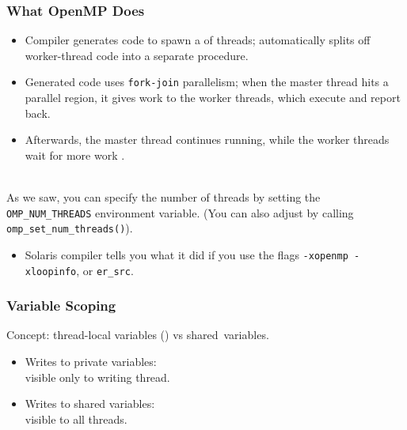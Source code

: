 \documentclass[aspectratio=43]{beamer}
\newenvironment{changemargin}[1]{%
  \begin{list}{}{%
    \setlength{\topsep}{0pt}%
    \setlength{\leftmargin}{#1}%
    \setlength{\rightmargin}{1em}
    \setlength{\listparindent}{\parindent}%
    \setlength{\itemindent}{\parindent}%
    \setlength{\parsep}{\parskip}%
  }%
  \item[]}{\end{list}}
\begin{document}
\begin{frame}[containsverbatim]
  \frametitle{What OpenMP Does}

  \begin{changemargin}{2cm}
  \begin{itemize}
    \item Compiler generates code to spawn a 
of threads; automatically splits off worker-thread code into a
separate procedure.
    \item Generated code uses {\tt fork-join} parallelism; when the
master thread hits a parallel region, it gives work to the worker
threads, which execute and report back.
    \item Afterwards, the master thread
continues running, while the worker threads wait for more work .
  \end{itemize}

~\\
As we saw, you can specify the number of threads by setting the
\verb+OMP_NUM_THREADS+ environment variable. (You can also adjust by calling 
\verb+omp_set_num_threads()+).

\begin{itemize}
  \item Solaris compiler tells you what it did if you use the flags \verb+-xopenmp -xloopinfo+, or \verb+er_src+.
\end{itemize}

  \end{changemargin}


\end{frame}

\begin{frame}[fragile]
  \frametitle{Variable Scoping}

  \begin{changemargin}{1.5cm}

  Concept: thread-local variables ()
      vs shared~variables.
  \begin{itemize}
    \item Writes to private variables:\\
\qquad visible only to writing thread.
    \item Writes to shared variables:\\ 
\qquad visible to all threads.
  \end{itemize}

  \end{changemargin}

\end{frame}
\end{document}
